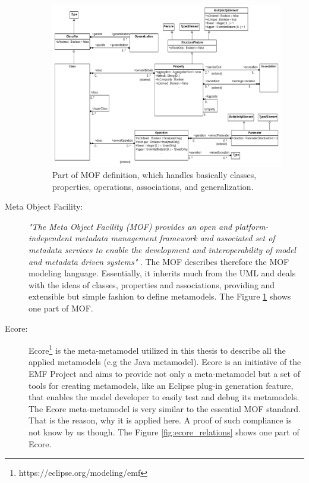\documentclass[tuberlin,cic,tc,english,noabntcite]{iiufrgs}
\begin{document}
\begin{description}
	\begin{figure}[H]
	    \caption{Part of MOF definition, which handles basically classes, properties, operations, associations, and generalization.}
	    \begin{center}
	        \includegraphics[width=.7\textwidth]{emof_classes}   
	    \end{center}
	    \label{fig:emof_classes}
	\end{figure}
	
	\item[Meta Object Facility:] \emph{"The Meta Object Facility (MOF) provides an open and platform-independent metadata management framework and associated set of metadata services to enable the development and interoperability of model and metadata driven systems"} \citep{omg2015meta}. The MOF describes therefore the MOF modeling language. Essentially, it inherits much from the UML and deals with the ideas of classes, properties and associations, providing and extensible but simple fashion to define metamodels. The Figure \ref{fig:emof_classes} shows one part of MOF.
	

	\item[Ecore:] Ecore\footnote{https://eclipse.org/modeling/emf} is the meta-metamodel utilized in this thesis to describe all the applied metamodels (e.g the Java metamodel). Ecore is an initiative of the EMF Project and aims to provide not only a meta-metamodel but a set of tools for creating metamodels, like an Eclipse plug-in generation feature, that enables the model developer to easily test and debug its metamodels. The Ecore meta-metamodel is very similar to the essential MOF standard. That is the reason, why it is applied here. A proof of such compliance is not know by us though. The Figure \ref{fig:ecore_relations} shows one part of Ecore.


\end{description}
\end{document}
